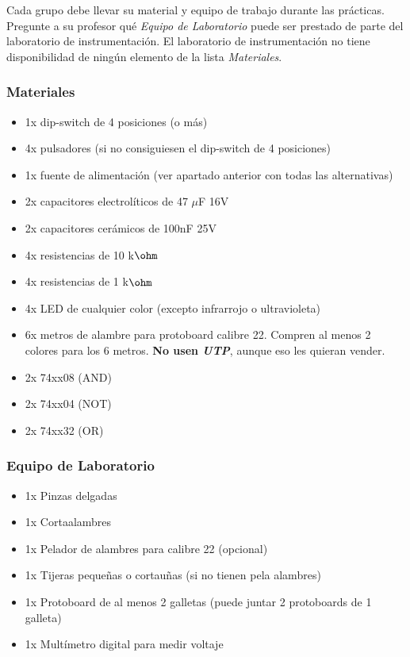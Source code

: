 Cada grupo debe llevar su material y equipo de trabajo durante las prácticas. Pregunte a su profesor qué \emph{Equipo de Laboratorio} puede ser prestado
de parte del laboratorio de instrumentación. El laboratorio de instrumentación no tiene disponibilidad de ningún elemento de la lista \emph{Materiales}.

\subsubsection*{Materiales}
\begin{itemize}
    \item 1x dip-switch de 4 posiciones (o más)
    \item 4x pulsadores (si no consiguiesen el dip-switch de 4 posiciones)
    \item 1x fuente de alimentación (ver apartado anterior con todas las alternativas)
    \item 2x capacitores electrolíticos de 47 $\mu$F 16V
    \item 2x capacitores cerámicos de 100nF 25V
    \item 4x resistencias de 10 k$\ohm$
    \item 4x resistencias de 1 k$\ohm$
    \item 4x LED de cualquier color (excepto infrarrojo o ultravioleta)
    \item 6x metros de alambre para protoboard calibre 22. Compren al menos 2 colores para los 6 metros. \textbf{No usen \emph{UTP}}, aunque eso les quieran vender.
    \item 2x 74xx08 (AND)
    \item 2x 74xx04 (NOT)
    \item 2x 74xx32 (OR)
\end{itemize}


\subsubsection*{Equipo de Laboratorio}
\begin{itemize}
    \item 1x Pinzas delgadas
    \item 1x Cortaalambres
    \item 1x Pelador de alambres para calibre 22 (opcional)
    \item 1x Tijeras pequeñas o cortauñas (si no tienen pela alambres)
    \item 1x Protoboard de al menos 2 galletas (puede juntar 2 protoboards de 1 galleta)
    \item 1x Multímetro digital para medir voltaje
\end{itemize}

